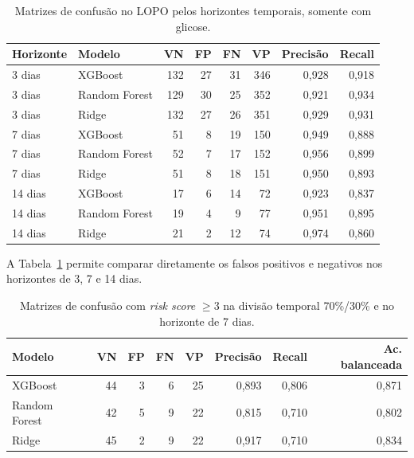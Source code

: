 \documentclass[12pt,a4paper]{article}
\begin{document}
\begin{table}[H]
    \centering
    \caption{Matrizes de confusão no LOPO pelos horizontes temporais,
    somente com glicose.}
    \label{tab:matrizes-confusao-horizontes}
    \small
    \begin{tabular}{llrrrrrr}
        \toprule
        Horizonte & Modelo & VN & FP & FN & VP & Precisão & Recall \\
        \midrule
        3 dias & XGBoost & 132 & 27 & 31 & 346 & 0,928 & 0,918 \\
        3 dias & Random Forest & 129 & 30 & 25 & 352 & 0,921 & 0,934 \\
        3 dias & Ridge & 132 & 27 & 26 & 351 & 0,929 & 0,931 \\
        7 dias & XGBoost & 51 & 8 & 19 & 150 & 0,949 & 0,888 \\
        7 dias & Random Forest & 52 & 7 & 17 & 152 & 0,956 & 0,899 \\
        7 dias & Ridge & 51 & 8 & 18 & 151 & 0,950 & 0,893 \\
        14 dias & XGBoost & 17 & 6 & 14 & 72 & 0,923 & 0,837 \\
        14 dias & Random Forest & 19 & 4 & 9 & 77 & 0,951 & 0,895 \\
        14 dias & Ridge & 21 & 2 & 12 & 74 & 0,974 & 0,860 \\
        \bottomrule
    \end{tabular}
\end{table}

A Tabela~\ref{tab:matrizes-confusao-horizontes} permite comparar diretamente
os falsos positivos e negativos nos horizontes de 3, 7 e 14 dias.

\begin{table}[H]
    \centering
    \caption{Matrizes de confusão com \textit{risk score} $\geq 3$ na divisão
    temporal 70\%/30\% e no horizonte de 7 dias.}
    \label{tab:matrizes-confusao-threshold3-temporal}
    \small
    \begin{tabular}{lrrrrrrr}
        \toprule
        Modelo & VN & FP & FN & VP & Precisão & Recall & Ac. balanceada \\
        \midrule
        XGBoost & 44 & 3 & 6 & 25 & 0,893 & 0,806 & 0,871 \\
        Random Forest & 42 & 5 & 9 & 22 & 0,815 & 0,710 & 0,802 \\
        Ridge & 45 & 2 & 9 & 22 & 0,917 & 0,710 & 0,834 \\
        \bottomrule
    \end{tabular}
\end{table}
\end{document}

